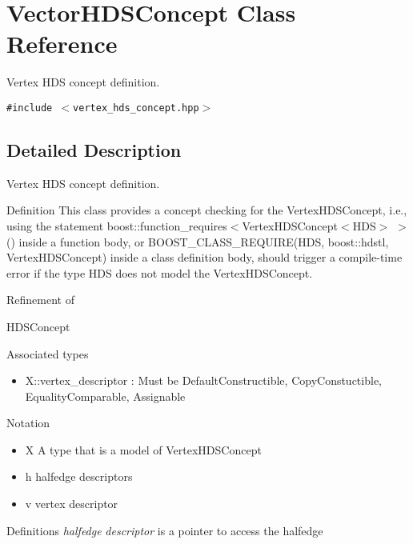 \section{Vector\-HDSConcept Class Reference}
\label{classVectorHDSConcept}
Vertex HDS concept definition.  


{\tt \#include $<$vertex\_\-hds\_\-concept.hpp$>$}



\subsection{Detailed Description}
Vertex HDS concept definition. 

\begin{Desc}
\item[Definition]This class provides a concept checking for the Vertex\-HDSConcept, i.e., using the statement boost::function\_\-requires$<$Vertex\-HDSConcept$<$HDS$>$ $>$() inside a function body, or BOOST\_\-CLASS\_\-REQUIRE(HDS, boost::hdstl, Vertex\-HDSConcept) inside a class definition body, should trigger a compile-time error if the type HDS does not model the Vertex\-HDSConcept.\end{Desc}
\begin{Desc}
\item[Refinement of]\end{Desc}
\begin{Desc}
\item[HDSConcept]\end{Desc}
\begin{Desc}
\item[Associated types]\begin{itemize}
\item X::vertex\_\-descriptor : Must be Default\-Constructible, Copy\-Constuctible, Equality\-Comparable, Assignable\end{itemize}
\end{Desc}
\begin{Desc}
\item[Notation]\begin{itemize}
\item X A type that is a model of Vertex\-HDSConcept\item h halfedge descriptors\item v vertex descriptor\end{itemize}
\end{Desc}
\begin{Desc}
\item[Definitions]{\em halfedge\/} {\em descriptor\/} is a pointer to access the halfedge\end{Desc}
